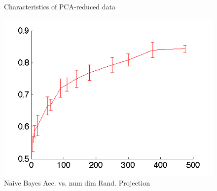 \documentclass[]{article}
\begin{document}
\begin{figure}[!ht]
\centering
{}
\caption{Characteristics of PCA-reduced data}
\label{fig:PCA_RED}
\end{figure}

\begin{center}
\begin{figure}[!ht]
\centering
\includegraphics[width=.5\textwidth]{../images/accuracy_vs_dim_randproj.png}
\caption{Naive Bayes Acc. vs. num dim Rand. Projection}
\label{fig:nb_rand_proj}
\end{figure}
\end{center}

\end{document}
